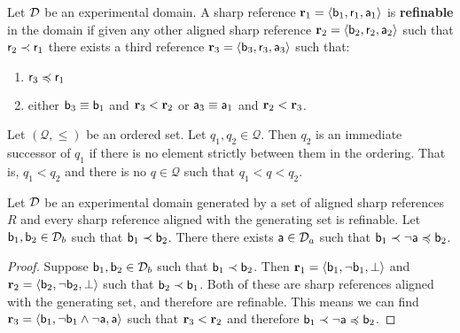 \documentclass[11pt,letterpaper,fleqn]{memoir} %
\begin{document}
\begin{mathSection}
\begin{defn}
	Let $\edomain$ be an experimental domain. A sharp reference $\refStmt_1 = \langle \stmt[b]_1, \stmt[r]_1, \stmt[a]_1\rangle$ is \textbf{refinable} in the domain if given any other aligned sharp reference $\refStmt_2 = \langle \stmt[b]_2, \stmt[r]_2, \stmt[a]_2\rangle$ such that $\stmt[r]_2 \snarrower \stmt[r]_1$ there exists a third reference $\refStmt_3 = \langle \stmt[b]_3, \stmt[r]_3, \stmt[a]_3\rangle$ such that:
	\begin{enumerate}
		\item $\stmt[r]_3 \narrower \stmt[r]_1$
		\item either $\stmt[b]_3 \equiv \stmt[b]_1$ and $\refStmt_3 < \refStmt_2$ or $\stmt[a]_3 \equiv \stmt[a]_1$ and $\refStmt_2 < \refStmt_3$.
	\end{enumerate}
\end{defn}
\begin{defn}
	Let $(\mathcal{Q}, \leq)$ be an ordered set. Let $q_1, q_2 \in \mathcal{Q}$. Then $q_2$ is an immediate successor of $q_1$ if there is no element strictly between them in the ordering. That is, $q_1 < q_2$ and there is no $q \in \mathcal{Q}$ such that $q_1 < q < q_2$.
\end{defn}
\begin{prop}\label{prop_refinable_within}
	Let $\edomain$ be an experimental domain generated by a set of aligned sharp references $R$ and every sharp reference aligned with the generating set is refinable. Let $\stmt[b]_1, \stmt[b]_2 \in \edomain_b$ such that $\stmt[b]_1 \snarrower \stmt[b]_2$. There there exists $\stmt[a] \in \edomain_a$ such that $\stmt[b]_1 \snarrower \NOT \stmt[a] \narrower \stmt[b]_2$.
\end{prop}
\begin{proof}
	Suppose $\stmt[b]_1, \stmt[b]_2 \in \edomain_b$ such that $\stmt[b]_1 \snarrower \stmt[b]_2$. Then $\refStmt_1 = \langle \stmt[b]_1, \NOT \stmt[b]_1, \contradiction \rangle$ and  $\refStmt_2 = \langle \stmt[b]_2, \NOT \stmt[b]_2, \contradiction\rangle$ such that $\stmt[b]_2 \snarrower \stmt[b]_1$. Both of these are sharp references aligned with the generating set, and therefore are refinable. This means we can find $\refStmt_3 = \langle \stmt[b]_1, \NOT \stmt[b]_1 \AND \NOT \stmt[a], \stmt[a] \rangle$ such that $\refStmt_3 < \refStmt_2$ and therefore $\stmt[b]_1 \snarrower \NOT \stmt[a] \narrower \stmt[b]_2$.
\end{proof}
\begin{prop}\label{prop_before_equal_statement}

\end{prop}
\end{mathSection}
\end{document}
